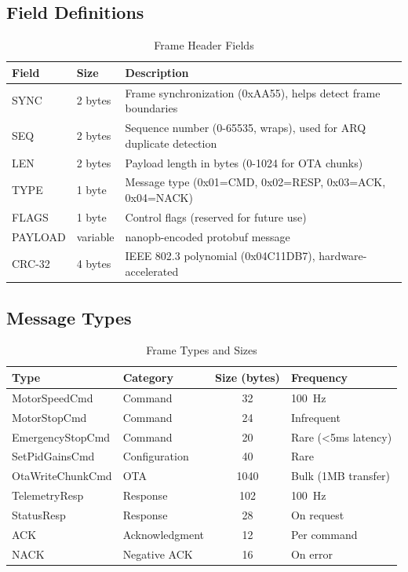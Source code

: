 \subsection{Field Definitions}

\begin{table}[H]
\centering
\caption{Frame Header Fields}
\begin{tabular}{llp{7cm}}
\toprule
\textbf{Field} & \textbf{Size} & \textbf{Description} \\
\midrule
SYNC & 2 bytes & Frame synchronization (0xAA55), helps detect frame boundaries \\
SEQ & 2 bytes & Sequence number (0-65535, wraps), used for ARQ duplicate detection \\
LEN & 2 bytes & Payload length in bytes (0-1024 for OTA chunks) \\
TYPE & 1 byte & Message type (0x01=CMD, 0x02=RESP, 0x03=ACK, 0x04=NACK) \\
FLAGS & 1 byte & Control flags (reserved for future use) \\
PAYLOAD & variable & nanopb-encoded protobuf message \\
CRC-32 & 4 bytes & IEEE 802.3 polynomial (0x04C11DB7), hardware-accelerated \\
\bottomrule
\end{tabular}
\end{table}

\subsection{Message Types}

\begin{table}[H]
\centering
\caption{Frame Types and Sizes}
\begin{tabular}{llcl}
\toprule
\textbf{Type} & \textbf{Category} & \textbf{Size (bytes)} & \textbf{Frequency} \\
\midrule
MotorSpeedCmd & Command & 32 & 100~Hz \\
MotorStopCmd & Command & 24 & Infrequent \\
EmergencyStopCmd & Command & 20 & Rare (<5ms latency) \\
SetPidGainsCmd & Configuration & 40 & Rare \\
OtaWriteChunkCmd & OTA & 1040 & Bulk (1MB transfer) \\
TelemetryResp & Response & 102 & 100~Hz \\
StatusResp & Response & 28 & On request \\
ACK & Acknowledgment & 12 & Per command \\
NACK & Negative ACK & 16 & On error \\
\bottomrule
\end{tabular}
\end{table}

